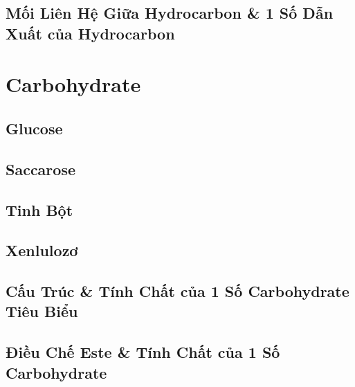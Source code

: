 \documentclass{article}
\numberwithin{equation}{section}
\begin{document}

\subsection{Mối Liên Hệ Giữa Hydrocarbon \& 1 Số Dẫn Xuất của Hydrocarbon}


\section{Carbohydrate}

\subsection{Glucose}


\subsection{Saccarose}


\subsection{Tinh Bột}


\subsection{Xenlulozơ}


\subsection{Cấu Trúc \& Tính Chất của 1 Số Carbohydrate Tiêu Biểu}


\subsection{Điều Chế Este \& Tính Chất của 1 Số Carbohydrate}
\end{document}
